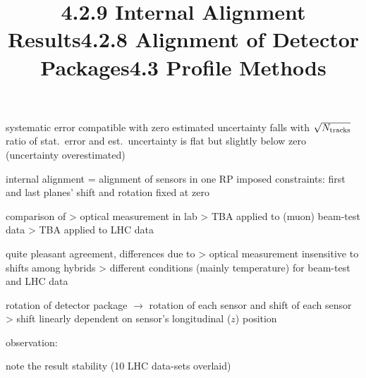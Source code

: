 
\> systematic error compatible with zero
\> estimated uncertainty falls with $\sqrt{N_{\rm tracks}}$
\> ratio of stat.~error and est.~uncertainty is flat but slightly below zero (uncertainty overestimated)

\newpage%
\title{4.2.9 Internal Alignment Results}

\> internal alignment = alignment of sensors in one RP
\> imposed constraints: first and last planes' shift and rotation fixed at zero

\> comparison of
\>> optical measurement in lab
\>> TBA applied to (muon) beam-test data
\>> TBA applied to LHC data


\> quite pleasant agreement, differences due to
\>> optical measurement insensitive to shifts among hybrids
\>> different conditions (mainly temperature) for beam-test and LHC data

\newpage%
\title{4.2.8 Alignment of Detector Packages}

\> rotation of detector package $\longrightarrow$ rotation of each sensor and shift of each sensor
\>> shift linearly dependent on sensor's longitudinal ($z$) position


\> observation:


\> note the result stability (10 LHC data-sets overlaid)


%
%

\newpage%
\title{4.3 Profile Methods}

